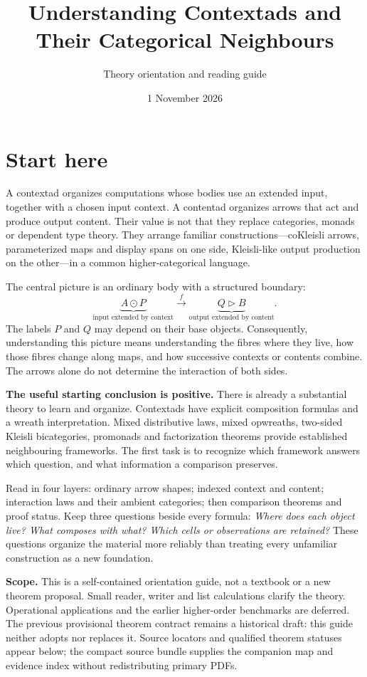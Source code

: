 \documentclass[11pt,letterpaper]{article}
\title{Understanding Contextads and Their Categorical Neighbours}
\author{Theory orientation and reading guide}
\date{1 November 2026}
\newcommand{\ext}{\mathbin{\odot}}
\newcommand{\cext}{\mathbin{\triangleright}}
\begin{document}
\maketitle
\thispagestyle{empty}
\section*{Start here}
A contextad organizes computations whose bodies use an extended input, together with a chosen input context. A contentad organizes arrows that act and produce output content. Their value is not that they replace categories, monads or dependent type theory. They arrange familiar constructions---coKleisli arrows, parameterized maps and display spans on one side, Kleisli-like output production on the other---in a common higher-categorical language.

The central picture is an ordinary body with a structured boundary:
\[
\underbrace{A\ext P}_{\text{input extended by context}}
\xrightarrow{\ f\ }
\underbrace{Q\cext B}_{\text{output extended by content}}.
\]
The labels $P$ and $Q$ may depend on their base objects. Consequently, understanding this picture means understanding the fibres where they live, how those fibres change along maps, and how successive contexts or contents combine. The arrows alone do not determine the interaction of both sides.

\textbf{The useful starting conclusion is positive.} There is already a substantial theory to learn and organize. Contextads have explicit composition formulas and a wreath interpretation. Mixed distributive laws, mixed opwreaths, two-sided Kleisli bicategories, promonads and factorization theorems provide established neighbouring frameworks. The first task is to recognize which framework answers which question, and what information a comparison preserves.

Read in four layers: ordinary arrow shapes; indexed context and content; interaction laws and their ambient categories; then comparison theorems and proof status. Keep three questions beside every formula: \emph{Where does each object live? What composes with what? Which cells or observations are retained?} These questions organize the material more reliably than treating every unfamiliar construction as a new foundation.

\textbf{Scope.} This is a self-contained orientation guide, not a textbook or a new theorem proposal. Small reader, writer and list calculations clarify the theory. Operational applications and the earlier higher-order benchmarks are deferred. The previous provisional theorem contract remains a historical draft: this guide neither adopts nor replaces it. Source locators and qualified theorem statuses appear below; the compact source bundle supplies the companion map and evidence index without redistributing primary PDFs.
\end{document}
